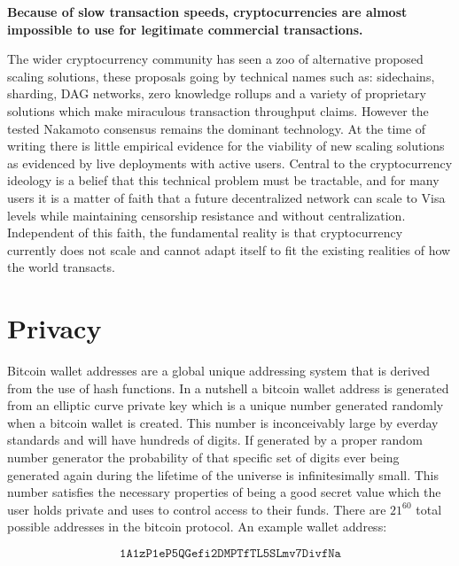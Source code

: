 \begin{infobox}
 \textbf{ Because of slow transaction speeds, cryptocurrencies are almost
  impossible to use for legitimate commercial transactions. }
\end{infobox}

The wider cryptocurrency community has seen a zoo of alternative proposed
scaling solutions, these proposals going by technical names such as: sidechains,
sharding, DAG networks, zero knowledge rollups and a variety of proprietary
solutions which make miraculous transaction throughput claims.  However the
tested Nakamoto consensus remains the dominant technology. At the time of
writing there is little empirical evidence for the viability of new scaling
solutions as evidenced by live deployments with active users. Central to the
cryptocurrency ideology is a belief that this technical problem must be
tractable, and for many users it is a matter of faith that a future
decentralized network can scale to Visa levels while maintaining censorship
resistance and without centralization. Independent of this faith, the
fundamental reality is that cryptocurrency currently does not scale and cannot
adapt itself to fit the existing realities of how the world transacts.

\section{Privacy}


Bitcoin wallet addresses are a global unique addressing system that is derived
from the use of hash functions. In a nutshell a bitcoin wallet address is
generated from an elliptic curve private key which is a unique number generated
randomly when a bitcoin wallet is created. This number is inconceivably large by
everday standards and will have hundreds of digits. If generated by a proper
random number generator the probability of that specific set of digits ever
being generated again during the lifetime of the universe is infinitesimally
small. This number satisfies the necessary properties of being a good secret
value which the user holds private and uses to control access to their funds.
There are $21^{60}$ total possible addresses in the bitcoin protocol. An example
wallet address:

$$
\texttt{1A1zP1eP5QGefi2DMPTfTL5SLmv7DivfNa}
$$


